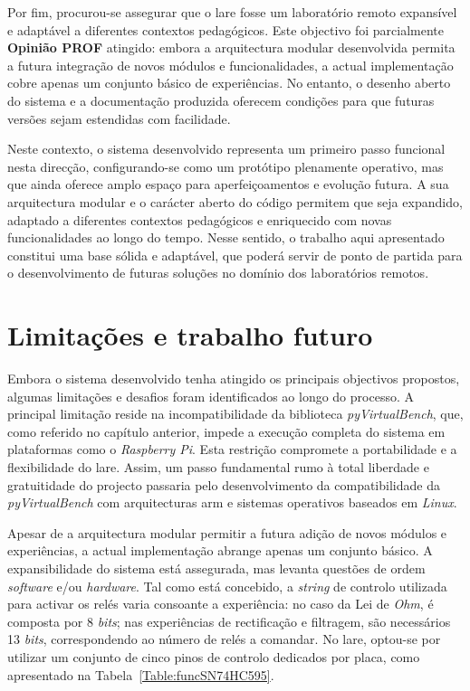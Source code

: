 Por fim, procurou-se assegurar que o \acrshort{lare} fosse um laboratório remoto expansível e adaptável a diferentes contextos pedagógicos. Este objectivo foi parcialmente \textbf{Opinião PROF} atingido: embora a arquitectura modular desenvolvida permita a futura integração de novos módulos e funcionalidades, a actual implementação cobre apenas um conjunto básico de experiências. No entanto, o desenho aberto do sistema e a documentação produzida oferecem condições para que futuras versões sejam estendidas com facilidade.

Neste contexto, o sistema desenvolvido representa um primeiro passo funcional nesta direcção, configurando-se como um protótipo plenamente operativo, mas que ainda oferece amplo espaço para aperfeiçoamentos e evolução futura. A sua arquitectura modular e o carácter aberto do código permitem que seja expandido, adaptado a diferentes contextos pedagógicos e enriquecido com novas funcionalidades ao longo do tempo. Nesse sentido, o trabalho aqui apresentado constitui uma base sólida e adaptável, que poderá servir de ponto de partida para o desenvolvimento de futuras soluções no domínio dos laboratórios remotos.

\section{Limitações e trabalho futuro}
\label{limitacoes}
Embora o sistema desenvolvido tenha atingido os principais objectivos propostos, algumas limitações e desafios foram identificados ao longo do processo. A principal limitação reside na incompatibilidade da biblioteca \textit{pyVirtualBench}, que, como referido no capítulo anterior, impede a execução completa do sistema em plataformas como o \textit{Raspberry Pi}. Esta restrição compromete a portabilidade e a flexibilidade do \acrshort{lare}. Assim, um passo fundamental rumo à total liberdade e gratuitidade do projecto passaria pelo desenvolvimento da compatibilidade da \textit{pyVirtualBench} com arquitecturas \acrshort{arm} e sistemas operativos baseados em \textit{Linux}.

Apesar de a arquitectura modular permitir a futura adição de novos módulos e experiências, a actual implementação abrange apenas um conjunto básico. A expansibilidade do sistema está assegurada, mas levanta questões de ordem \textit{software} e/ou \textit{hardware}. Tal como está concebido, a \textit{string} de controlo utilizada para activar os relés varia consoante a experiência: no caso da Lei de \textit{Ohm}, é composta por 8 \textit{bits}; nas experiências de rectificação e filtragem, são necessários 13 \textit{bits}, correspondendo ao número de relés a comandar. No \acrshort{lare}, optou-se por utilizar um conjunto de cinco pinos de controlo dedicados por placa, como apresentado na Tabela~\ref{Table:funcSN74HC595}.

